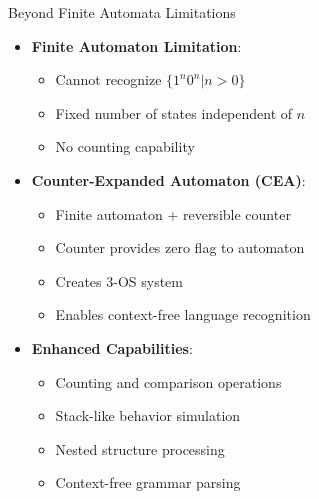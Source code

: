 \documentclass[aspectratio=169,11pt]{beamer}
\newcommand{\concept}[1]{\textbf{\color{accentcolor}#1}}
\begin{document}
\begin{frame}{Beyond Finite Automata Limitations}
\begin{itemize}
\item \concept{Finite Automaton Limitation}:
\begin{itemize}
\item Cannot recognize $\{1^n0^n | n > 0\}$
\item Fixed number of states independent of $n$
\item No counting capability
\end{itemize}
\vspace{0.5cm}
\item \concept{Counter-Expanded Automaton (CEA)}:
\begin{itemize}
\item Finite automaton + reversible counter
\item Counter provides zero flag to automaton
\item Creates 3-OS system
\item Enables context-free language recognition
\end{itemize}
\vspace{0.3cm}
\item \concept{Enhanced Capabilities}:
\begin{itemize}
\item Counting and comparison operations
\item Stack-like behavior simulation
\item Nested structure processing
\item Context-free grammar parsing
\end{itemize}
\end{itemize}
\end{frame}
\end{document}
